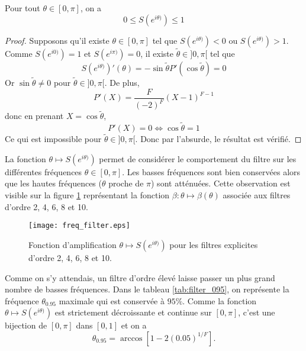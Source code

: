 \begin{proposition}
Pour tout $\theta \in [0, \pi]$, on a 
\begin{equation}
0 \leq S(e^{i\theta)}) \leq 1
\end{equation}
\label{prop:ampli_ftr}
\end{proposition}

\begin{proof}
Supposons qu'il existe $\theta \in [0, \pi]$ tel que $S(e^{i\theta)}) < 0$ ou $S(e^{i\theta)}) > 1$. Comme $S(e^{i 0)})=1$ et $S(e^{i\pi)}) = 0$, il existe $\tilde{\theta} \in ]0, \pi[$ tel que 
\begin{equation}
S(e^{i\theta)})'(\theta) = - \sin \tilde{\theta} P'(\cos \tilde{\theta} ) = 0
\end{equation}
Or $\sin \tilde{\theta} \neq 0$ pour $\tilde{\theta} \in ]0, \pi[$.
De plus, 
\begin{equation}
P'(X) = \dfrac{F}{(-2)^F}(X-1)^{F-1}
\end{equation}
donc en prenant $X = \cos \tilde{\theta}$,
\begin{equation*}
P'(X) = 0 \Leftrightarrow \cos \tilde{\theta} = 1
\end{equation*}
Ce qui est impossible pour $\tilde{\theta} \in ]0, \pi[$. Donc par l'absurde, le résultat est vérifié.
\end{proof}

La fonction $\theta \mapsto S(e^{i\theta)})$ permet de considérer le comportement du filtre sur les différentes fréquences $\theta \in [0, \pi]$. Les basses fréquences sont bien conservées alors que les hautes fréquences ($\theta$ proche de $\pi$) sont atténuées. Cette observation est visible sur la figure \ref{fig:freq_filter} représentant la fonction $\beta : \theta \mapsto \beta(\theta)$ associée aux filtres d'ordre 2, 4, 6, 8 et 10. 

\begin{figure}[htbp]
\begin{center}
\texttt{[image: freq\_filter.eps]}
\end{center}
\caption{Fonction d'amplification $\theta \mapsto S(e^{i\theta)})$ pour les filtres explicites d'ordre 2, 4, 6, 8 et 10.}
\label{fig:freq_filter}
\end{figure}
Comme on s'y attendais, un filtre d'ordre élevé laisse passer un plus grand nombre de basses fréquences. Dans le tableau \ref{tab:filter_095}, on représente la fréquence $\theta_{0.95}$ maximale qui est conservée à $95\%$. Comme la fonction $\theta \mapsto S(e^{i\theta)})$ est strictement décroissante et continue sur $[0,\pi]$, c'est une bijection de $[0,\pi]$ dans $[0,1]$ et on a 
\begin{equation}
\theta_{0.95} = \arccos \left[ 1-2 (0.05)^{1/F} \right].
\end{equation}

